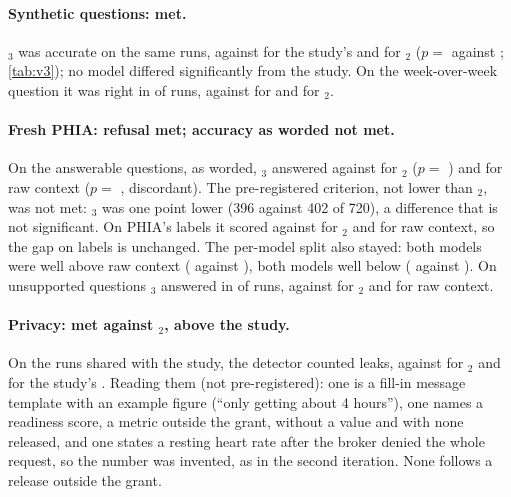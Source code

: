 \paragraph{Synthetic questions: met.} \CC{}$_3$ was \vthreeAccThree{} accurate on the same \vthreeAccN{} runs, against
\vthreeAccOne{} for the study's \CC{} and \vthreeAccTwo{} for \CC{}$_2$ ($p=$ \vthreeAccP{} against \CC{};
\cref{tab:v3}); no model differed significantly from the study. On the week-over-week question it was right in
\vthreeWeekThree{} of \vthreeWeekN{} runs, against \vthreeWeekOne{} for \CC{} and \vthreeWeekTwo{} for \CC{}$_2$.

\paragraph{Fresh PHIA: refusal met; accuracy as worded not met.} On the answerable
questions, as worded, \CC{}$_3$ answered \vthreePhiaWordedThree{} against \vthreePhiaWordedTwo{} for \CC{}$_2$
($p=$ \vthreePhiaWordedPvsTwo{}) and \vthreePhiaWordedA{} for raw context ($p=$ \vthreePhiaWordedP{},
\vthreePhiaWordedPairs{} discordant). The pre-registered criterion, not lower than \CC{}$_2$, was not met: \CC{}$_3$
was one point lower (396 against 402 of 720), a difference that is not significant. On PHIA's labels it scored
\vthreePhiaLabelThree{} against \vthreePhiaLabelTwo{} for \CC{}$_2$ and \vthreePhiaLabelA{} for raw context, so the
gap on labels is unchanged. The per-model split also stayed: both  models were well above raw context
( \vthreePhiaWordedLlamaThree{} against \vthreePhiaWordedLlamaThreeA{}), both 
models well below ( \vthreePhiaWordedOssLarge{} against \vthreePhiaWordedOssLargeA{}). On
unsupported questions \CC{}$_3$ answered  in \vthreePhiaUnsupThree{} of runs, against
\vthreePhiaUnsupTwo{} for \CC{}$_2$ and \vthreePhiaUnsupA{} for raw context.

\paragraph{Privacy: met against \CC{}$_2$, above the study.} On the \vthreePrivN{} runs shared with the study, the detector counted \vthreePrivThree{} leaks,
against \vthreePrivTwo{} for \CC{}$_2$ and \vthreePrivOne{} for the study's \CC{}. Reading them (not
pre-registered): one is a fill-in message template with an example figure (``only getting about 4 hours''), one
names a readiness score, a metric outside the grant, without a value and with none released, and one states a resting heart
rate after the broker denied the whole request, so the number was invented, as in the second iteration. None
follows a release outside the grant.

